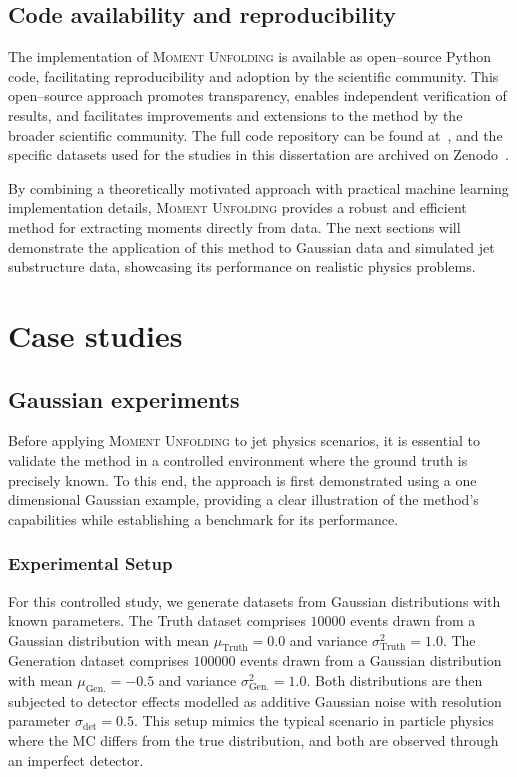    \subsection{Code availability and reproducibility}
        The implementation of \textsc{Moment Unfolding} is available as open--source Python code, facilitating reproducibility and adoption by the scientific community.
        This open--source approach promotes transparency, enables independent verification of results, and facilitates improvements and extensions to the method by the broader scientific community.
        The full code repository can be found at~\cite{HEP-GAN/MomentUnfolding:Method}, and the specific datasets used for the studies in this dissertation are archived on Zenodo~\cite{AndreassenPythia/HerwigUnfolding}.

    By combining a theoretically motivated approach with practical machine learning implementation details, \textsc{Moment Unfolding} provides a robust and efficient method for extracting moments directly from data.
    The next sections will demonstrate the application of this method to Gaussian data and simulated jet substructure data, showcasing its performance on realistic physics problems.
    
\section{Case studies}
    \subsection{Gaussian experiments}
        Before applying \textsc{Moment Unfolding} to jet physics scenarios, it is essential to validate the method in a controlled environment where the ground truth is precisely known.
        To this end, the approach is first demonstrated using a one dimensional Gaussian example, providing a clear illustration of the method's capabilities while establishing a benchmark for its performance.
        \subsubsection{Experimental Setup}
            For this controlled study, we generate datasets from Gaussian distributions with known parameters.
            The Truth dataset comprises \(\num{10000}\) events drawn from a Gaussian distribution with mean \(\mu_{\textrm{Truth}} = 0.0\) and variance \(\sigma^2_{\textrm{Truth}} = 1.0\).
            The Generation dataset comprises \(\num{100000}\) events drawn from a Gaussian distribution with mean $\mu_{\textrm{Gen.}} = -0.5$ and variance $\sigma^2_{\textrm{Gen.}} = 1.0$.
            Both distributions are then subjected to detector effects modelled as additive Gaussian noise with resolution parameter $\sigma_{\textrm{det}} = 0.5$.
            This setup mimics the typical scenario in particle physics where the MC differs from the true distribution, and both are observed through an imperfect detector.

